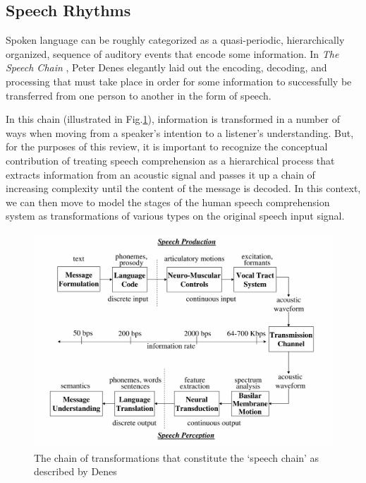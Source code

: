 \documentclass[titlepage]{article}
\begin{document}
  \subsection{Speech Rhythms}

    Spoken language can be roughly categorized as a quasi-periodic, 
    hierarchically organized, sequence of auditory events that encode some 
    information. In \textit{The Speech Chain} \cite{Denes1993}, Peter Denes 
    elegantly laid out the encoding, decoding, and processing that must take 
    place in order for some information to successfully be transferred from one
    person to another in the form of speech.

    In this chain (illustrated in Fig.\ref{speechChain}), information
    is transformed in a number of ways when moving from a speaker's intention 
    to a listener's
    understanding. But, for the purposes of this review, it is important to 
    recognize the
    conceptual contribution of treating speech comprehension as a hierarchical 
    process
    that extracts information from an acoustic signal and passes it up a chain 
    of increasing
    complexity until the content of the message is decoded. In this context, 
    we can then move
    to model the stages of the human speech comprehension system as 
    transformations of
    various types on the original speech input signal.

    \begin{figure}
      \centering
      \includegraphics[scale=0.3]{speechChain}
      \caption{The chain of transformations that constitute the `speech chain' as
      described by Denes \cite{Denes1993,Rabiner2007}}
      \label{speechChain}
    \end{figure}
\end{document}
